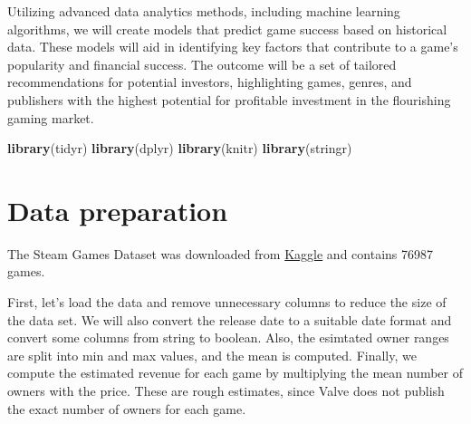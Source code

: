 \documentclass[
]{article}
\newenvironment{Shaded}{\begin{snugshade}}{\end{snugshade}}
\newcommand{\FunctionTok}[1]{\textcolor[rgb]{0.13,0.29,0.53}{\textbf{#1}}}
\newcommand{\NormalTok}[1]{#1}
\begin{document}
Utilizing advanced data analytics methods, including machine learning
algorithms, we will create models that predict game success based on
historical data. These models will aid in identifying key factors that
contribute to a game's popularity and financial success. The outcome
will be a set of tailored recommendations for potential investors,
highlighting games, genres, and publishers with the highest potential
for profitable investment in the flourishing gaming market.

\begin{Shaded}
\begin{Highlighting}[]
\FunctionTok{library}\NormalTok{(tidyr)}
\FunctionTok{library}\NormalTok{(dplyr)}
\FunctionTok{library}\NormalTok{(knitr)}
\FunctionTok{library}\NormalTok{(stringr)}
\end{Highlighting}
\end{Shaded}

\hypertarget{data-preparation}{%
\section{Data preparation}\label{data-preparation}}

The Steam Games Dataset was downloaded from
\href{https://www.kaggle.com/datasets/fronkongames/steam-games-dataset}{Kaggle}
and contains 76987 games.

First, let's load the data and remove unnecessary columns to reduce the
size of the data set. We will also convert the release date to a
suitable date format and convert some columns from string to boolean.
Also, the esimtated owner ranges are split into min and max values, and
the mean is computed. Finally, we compute the estimated revenue for each
game by multiplying the mean number of owners with the price. These are
rough estimates, since Valve does not publish the exact number of owners
for each game.
\end{document}
